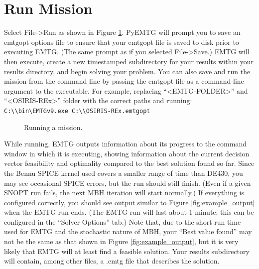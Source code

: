 \documentclass[11pt]{article}
\begin{document}
\section{Run Mission}
\label{sec:run_mission}

Select File-\textgreater Run as shown in Figure \ref{fig:running_mission}. PyEMTG will prompt you to save an emtgopt options file to ensure that your emtgopt file is saved to disk prior to executing \ac{EMTG}. (The same prompt as if you selected File-\textgreater Save.) \ac{EMTG} will then execute, create a new timestamped subdirectory for your results within your results directory, and begin solving your problem. You can also save and run the mission from the command line by passing the emtgopt file as a command-line argument to the executable. For example, replacing ``\textless EMTG-FOLDER\textgreater '' and ``\textless OSIRIS-REx\textgreater '' folder with the correct paths and running: \newline \texttt{C:\textbackslash<EMTG-FOLDER>\textbackslash bin\textbackslash EMTGv9.exe C:\textbackslash<OSIRIS-REx-FOLDER>\textbackslash OSIRIS-REx.emtgopt}

\begin{figure}[H]
	\centering
	\caption{\label{fig:running_mission}Running a mission.}
\end{figure}

\noindent While running, \ac{EMTG} outputs information about its progress to the command window in which it is executing, showing information about the current decision vector feasibility and optimality compared to the best solution found so far. Since the Bennu \acs{SPICE} kernel used covers a smaller range of time than DE430, you may see occasional \acs{SPICE} errors, but the run should still finish. (Even if a given \ac{SNOPT} run fails, the next \ac{MBH} iteration will start normally.) If everything is configured correctly, you should see output similar to Figure \ref{fig:example_output} when the \ac{EMTG} run ends. (The \ac{EMTG} run will last about 1 minute; this can be configured in the ``Solver Options'' tab.) Note that, due to the short run time used for \ac{EMTG} and the stochastic nature of \ac{MBH}, your ``Best value found'' may not be the same as that shown in Figure \ref{fig:example_output}, but it is very likely that \ac{EMTG} will at least find a feasible solution. Your results subdirectory will contain, among other files, a .emtg file that describes the solution.
\end{document}
